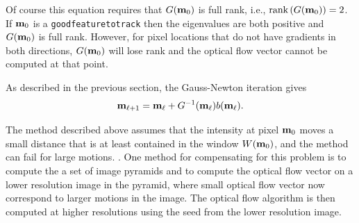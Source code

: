 Of course this equation requires that $G(\mathbf{m}_0)$ is full rank, i.e., $\text{rank}\left(G(\mathbf{m}_0)\right)=2$.  If $\mathbf{m}_0$ is a \texttt{goodfeaturetotrack} then the eigenvalues are both positive and $G(\mathbf{m}_0)$ is full rank.  However, for pixel locations that do not have gradients in both directions, $G(\mathbf{m}_0)$ will lose rank and the optical flow vector cannot be computed at that point.  

As described in the previous section, the Gauss-Newton iteration gives
\[
\mathbf{m}_{\ell+1} = \mathbf{m}_\ell + G^{-1}(\mathbf{m}_\ell) b(\mathbf{m}_\ell).
\]

The method described above assumes that the intensity at pixel $\mathbf{m}_0$ moves a small distance that is at least contained in the window $W(\mathbf{m}_0)$, and the method can fail for large motions.  
.
One method for compensating for this problem is to compute the a set of image pyramids and to compute the optical flow vector on a lower resolution image in the pyramid, where small optical flow vector now correspond to larger motions in the image.  The optical flow algorithm is then computed at higher resolutions using the seed from the lower resolution image.  

